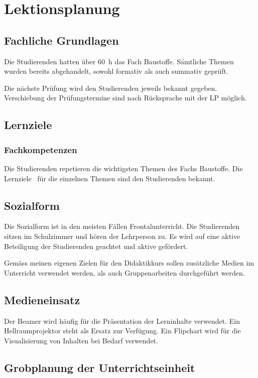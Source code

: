 \documentclass[
11pt,
captions=tableheading,
headsepline,
footsepline, 
captions=tableheading,
parskip=half-,
]{scrartcl}
\begin{document}
\clearpage


\section{Lektionsplanung}
\subsection{Fachliche Grundlagen}
Die Studierenden hatten über \SI{60}{\hour} das Fach Baustoffe. 
Sämtliche Themen wurden bereits abgehandelt, sowohl formativ als auch summativ geprüft. 

Die nächste Prüfung wird den Studierenden jeweils bekannt gegeben. 
Verschiebung der Prüfungstermine sind nach Rücksprache mit der LP möglich.



\subsection{Lernziele}
\subsubsection{Fachkompetenzen}
Die Studierenden repetieren die wichtigsten Themen des Fachs Baustoffe.
Die Lernziele \faBullseye\, für die einzelnen Themen sind den Studierenden bekannt.



\subsection{Sozialform}
Die Sozialform ist in den meisten Fällen Frontalunterricht. 
Die Studierenden sitzen im Schulzimmer und hören der Lehrperson zu. Es wird auf eine aktive Beteiligung der Studierenden geachtet und aktive gefördert. 

Gemäss meinen eigenen Zielen für den Didaktikkurs sollen zusätzliche Medien im Unterricht verwendet werden, als auch Gruppenarbeiten durchgeführt werden.

\subsection{Medieneinsatz}
Der Beamer wird häufig für die Präsentation der Lerninhalte verwendet. 
Ein Hellraumprojektor steht als Ersatz zur Verfügung. Ein Flipchart wird für die Visualisierung von Inhalten bei Bedarf verwendet.

\subsection{Grobplanung der Unterrichtseinheit}
\end{document}
